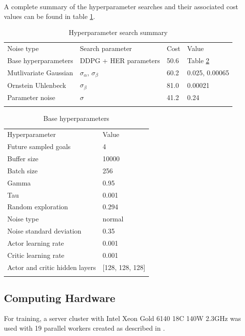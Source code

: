 A complete summary of the hyperparameter searches and their associated cost values can be found in table \ref{tab:hyperparam-summary}.

\begin{table}
\begin{tabular}{llll}
\hline\noalign{\smallskip}
Noise type & Search parameter & Cost & Value \\
\noalign{\smallskip}\hline\noalign{\smallskip}
Base hyperparameters & DDPG + HER parameters & 50.6 & Table \ref{tab:base-hyperparams} \\
Mutlivariate Gaussian & $\sigma_\alpha$, $\sigma_\beta$ & 60.2 & 0.025, 0.00065 \\
Ornstein Uhlenbeck & $\sigma_\beta$ & 81.0 & 0.00021 \\
Parameter noise & $\sigma$ & 41.2 & 0.24 \\
\noalign{\smallskip}\hline
\end{tabular}
\caption{Hyperparameter search summary}
\label{tab:hyperparam-summary} 
\end{table}

\begin{table}
\begin{tabular}{ll}
\hline\noalign{\smallskip}
Hyperparameter  & Value \\
\noalign{\smallskip}\hline\noalign{\smallskip}
Future sampled goals & 4 \\
Buffer size & 10000 \\
Batch size & 256 \\
Gamma & 0.95 \\
Tau & 0.001 \\
Random exploration & 0.294 \\
Noise type & normal \\
Noise standard deviation & 0.35 \\
Actor learning rate & 0.001 \\
Critic learning rate & 0.001 \\
Actor and critic hidden layers & [128, 128, 128] \\
\noalign{\smallskip}\hline
\end{tabular}
\caption{Base hyperparameters}
\label{tab:base-hyperparams} 
\end{table}

\subsection{Computing Hardware}
For training, a server cluster with Intel Xeon Gold 6140 18C 140W 2.3GHz was used with 19 parallel workers created as described in \cite{OpenAI2018}.

